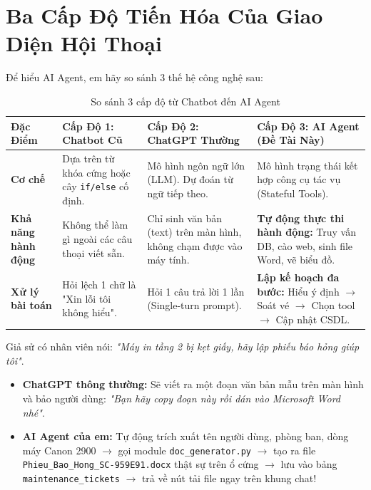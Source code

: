 \documentclass[11pt,a4paper]{article}
\begin{document}
\section{Ba Cấp Độ Tiến Hóa Của Giao Diện Hội Thoại}

Để hiểu AI Agent, em hãy so sánh 3 thế hệ công nghệ sau:

\begin{table}[H]
\centering
\small
\begin{tabularx}{\textwidth}{l X X X}
\toprule
\textbf{Đặc Điểm} & \textbf{Cấp Độ 1: Chatbot Cũ} & \textbf{Cấp Độ 2: ChatGPT Thường} & \textbf{Cấp Độ 3: AI Agent (Đề Tài Này)} \\
\midrule
\textbf{Cơ chế} & Dựa trên từ khóa cứng hoặc cây \texttt{if/else} cố định. & Mô hình ngôn ngữ lớn (LLM). Dự đoán từ ngữ tiếp theo. & Mô hình trạng thái kết hợp công cụ tác vụ (Stateful Tools). \\
\textbf{Khả năng hành động} & Không thể làm gì ngoài các câu thoại viết sẵn. & Chỉ sinh văn bản (text) trên màn hình, không chạm được vào máy tính. & \textbf{Tự động thực thi hành động:} Truy vấn DB, cào web, sinh file Word, vẽ biểu đồ. \\
\textbf{Xử lý bài toán} & Hỏi lệch 1 chữ là "Xin lỗi tôi không hiểu". & Hỏi 1 câu trả lời 1 lần (Single-turn prompt). & \textbf{Lập kế hoạch đa bước:} Hiểu ý định $\rightarrow$ Soát vé $\rightarrow$ Chọn tool $\rightarrow$ Cập nhật CSDL. \\
\bottomrule
\end{tabularx}
\caption{So sánh 3 cấp độ từ Chatbot đến AI Agent}
\end{table}

\begin{notebox}
Giả sử có nhân viên nói: \textit{"Máy in tầng 2 bị kẹt giấy, hãy lập phiếu báo hỏng giúp tôi"}.
\begin{itemize}
    \item \textbf{ChatGPT thông thường:} Sẽ viết ra một đoạn văn bản mẫu trên màn hình và bảo người dùng: \textit{"Bạn hãy copy đoạn này rồi dán vào Microsoft Word nhé"}.
    \item \textbf{AI Agent của em:} Tự động trích xuất tên người dùng, phòng ban, dòng máy Canon 2900 $\rightarrow$ gọi module \texttt{doc\_generator.py} $\rightarrow$ tạo ra file \texttt{Phieu\_Bao\_Hong\_SC-959E91.docx} thật sự trên ổ cứng $\rightarrow$ lưu vào bảng \texttt{maintenance\_tickets} $\rightarrow$ trả về nút tải file ngay trên khung chat!
\end{itemize}
\end{notebox}
\end{document}
